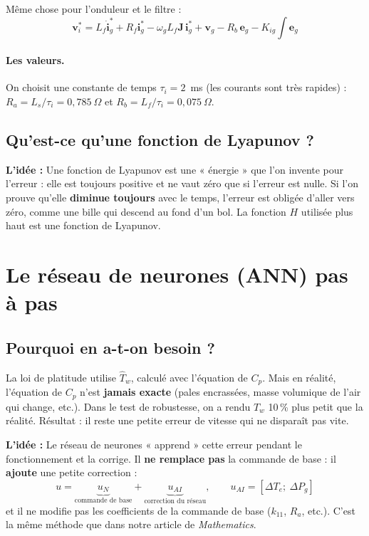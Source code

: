 \documentclass[11pt,a4paper]{article}
\newcommand{\bv}[1]{\boldsymbol{#1}}
\newcommand{\Idee}{\textbf{L'idée : }}
\begin{document}
Même chose pour l'onduleur et le filtre :
\begin{equation}
\boxed{\bv{v}_i^* = L_f\dot{\bv{i}}_g^* + R_f\bv{i}_g^* - \omega_g L_f\mathbf{J}\,\bv{i}_g^* + \bv{v}_g - R_b\,\bv{e}_g - K_{ig}\!\int\!\bv{e}_g}
\end{equation}

\paragraph{Les valeurs.} On choisit une constante de temps $\tau_i = 2$~ms (les courants sont très rapides) :
$R_a = L_s/\tau_i = 0{,}785~\Omega$ et $R_b = L_f/\tau_i = 0{,}075~\Omega$.

\subsection{Qu'est-ce qu'une fonction de Lyapunov ?}
\begin{idee}
\Idee
Une fonction de Lyapunov est une « énergie » que l'on invente pour l'erreur : elle est toujours positive et
ne vaut zéro que si l'erreur est nulle. Si l'on prouve qu'elle \textbf{diminue toujours} avec le temps,
l'erreur est obligée d'aller vers zéro, comme une bille qui descend au fond d'un bol. La fonction $H$
utilisée plus haut est une fonction de Lyapunov.
\end{idee}

\section{Le réseau de neurones (ANN) pas à pas}

\subsection{Pourquoi en a-t-on besoin ?}
La loi de platitude utilise $\hat T_w$, calculé avec l'équation de $C_p$. Mais en réalité, l'équation de
$C_p$ n'est \textbf{jamais exacte} (pales encrassées, masse volumique de l'air qui change, etc.). Dans le
test de robustesse, on a rendu $\hat T_w$ 10\,\% plus petit que la réalité. Résultat : il reste une petite
erreur de vitesse qui ne disparaît pas vite.
\begin{idee}
\Idee
Le réseau de neurones « apprend » cette erreur pendant le fonctionnement et la corrige. Il \textbf{ne remplace
pas} la commande de base : il \textbf{ajoute} une petite correction :
\[
u = \underbrace{u_N}_{\text{commande de base}} + \underbrace{u_{AI}}_{\text{correction du réseau}},
\qquad u_{AI} = [\Delta T_e;\ \Delta P_g]
\]
et il ne modifie pas les coefficients de la commande de base ($k_{11}$, $R_a$, etc.). C'est la même méthode
que dans notre article de \emph{Mathematics}.
\end{idee}
\end{document}
